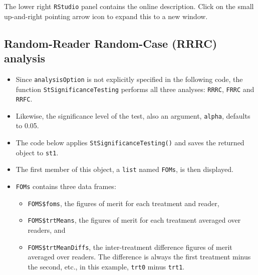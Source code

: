 \documentclass[
]{book}
\providecommand{\tightlist}{%
  \setlength{\itemsep}{0pt}\setlength{\parskip}{0pt}}
\begin{document}
The lower right \texttt{RStudio} panel contains the online description. Click on the small up-and-right pointing arrow icon to expand this to a new window.

\hypertarget{ORApplications-RRRC-dataset02-RJafroc}{%
\subsection{Random-Reader Random-Case (RRRC) analysis}\label{ORApplications-RRRC-dataset02-RJafroc}}

\begin{itemize}
\tightlist
\item
  Since \texttt{analysisOption} is not explicitly specified in the following code, the function \texttt{StSignificanceTesting} performs all three analyses: \texttt{RRRC}, \texttt{FRRC} and \texttt{RRFC}.
\item
  Likewise, the significance level of the test, also an argument, \texttt{alpha}, defaults to 0.05.
\item
  The code below applies \texttt{StSignificanceTesting()} and saves the returned object to \texttt{st1}.
\item
  The first member of this object, a \texttt{list} named \texttt{FOMs}, is then displayed.
\item
  \texttt{FOMs} contains three data frames:

  \begin{itemize}
  \tightlist
  \item
    \texttt{FOMS\$foms}, the figures of merit for each treatment and reader,
  \item
    \texttt{FOMS\$trtMeans}, the figures of merit for each treatment averaged over readers, and
  \item
    \texttt{FOMS\$trtMeanDiffs}, the inter-treatment difference figures of merit averaged over readers. The difference is always the first treatment minus the second, etc., in this example, \texttt{trt0} minus \texttt{trt1}.
  \end{itemize}
\end{itemize}
\end{document}
